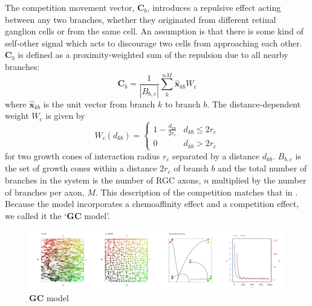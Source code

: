 \documentclass[11pt, a4paper, draft]{article}
\begin{document}
%
%
The competition movement vector, $\mathbf{C}_b$, introduces a repulsive effect
acting between any two branches, whether they originated from different
retinal ganglion cells or from the same cell. An assumption is that there is
some kind of self-other signal which acts to discourage two cells from
approaching each other. $\mathbf{C}_b$ is defined as a proximity-weighted sum
of the repulsion due to all nearby branches:
%
\begin{equation} \label{e:C}
\mathbf{C}_b = \frac{1}{|B_{b,c}|} \sum_k^{nM} \hat{\mathbf{x}}_{kb} W_c
\end{equation}
where $\hat{\mathbf{x}}_{kb}$ is the unit vector from branch $k$ to branch
$b$. The distance-dependent weight $W_c$ is given by
\begin{equation}
W_c(d_{kb}) = \begin{cases}
      1 - \frac{d_{kb}}{2r_c}   & d_{kb} \leq 2r_c \\
     0 & d_{kb} > 2r_c
     \end{cases}
\end{equation}
for two growth cones of interaction radius $r_c$ separated by a distance
$d_{kb}$. $B_{b,c}$ is the set of growth cones within a distance $2r_c$ of
branch $b$ and the total number of branches in the system is the number of RGC
axons, $n$ multiplied by the number of branches per axon, $M$. This
description of the competition matches that
in \citet{simpson_simple_2011}. Because the model incorporates a chemoaffinity
effect and a competition effect, we called it the `$\mathbf{GC}$ model'.

\begin{figure}
\includegraphics[width=\linewidth]{./images/j4_ee_GC_best_1_wt_figcomp1.png}
\caption{$\mathbf{GC}$ model}
\label{f:GC}
\end{figure}
\end{document}
